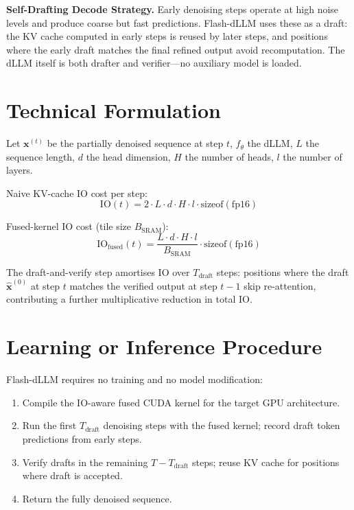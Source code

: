 \documentclass[10pt,twocolumn]{article}
\begin{document}
\textbf{Self-Drafting Decode Strategy.} Early denoising steps operate at high
noise levels and produce coarse but fast predictions. Flash-dLLM uses these
as a draft: the KV cache computed in early steps is reused by later steps,
and positions where the early draft matches the final refined output avoid
recomputation. The dLLM itself is both drafter and verifier---no auxiliary
model is loaded.

\section{Technical Formulation}

Let $\mathbf{x}^{(t)}$ be the partially denoised sequence at step $t$,
$f_\theta$ the dLLM, $L$ the sequence length, $d$ the head dimension,
$H$ the number of heads, $l$ the number of layers.

Naive KV-cache IO cost per step:
\[
\mathrm{IO}(t) = 2 \cdot L \cdot d \cdot H \cdot l \cdot \mathrm{sizeof}(\mathrm{fp16})
\]

Fused-kernel IO cost (tile size $B_{\mathrm{SRAM}}$):
\[
\mathrm{IO}_{\mathrm{fused}}(t)
  = \frac{L \cdot d \cdot H \cdot l}{B_{\mathrm{SRAM}}} \cdot \mathrm{sizeof}(\mathrm{fp16})
\]

The draft-and-verify step amortises IO over $T_{\mathrm{draft}}$ steps: positions
where the draft $\hat{\mathbf{x}}^{(0)}$ at step $t$ matches the verified output
at step $t-1$ skip re-attention, contributing a further multiplicative reduction
in total IO.

\section{Learning or Inference Procedure}

Flash-dLLM requires no training and no model modification:
\begin{enumerate}[itemsep=2pt,parsep=0pt]
  \item Compile the IO-aware fused CUDA kernel for the target GPU architecture.
  \item Run the first $T_{\mathrm{draft}}$ denoising steps with the fused kernel;
    record draft token predictions from early steps.
  \item Verify drafts in the remaining $T - T_{\mathrm{draft}}$ steps; reuse
    KV cache for positions where draft is accepted.
  \item Return the fully denoised sequence.
\end{enumerate}
\end{document}
